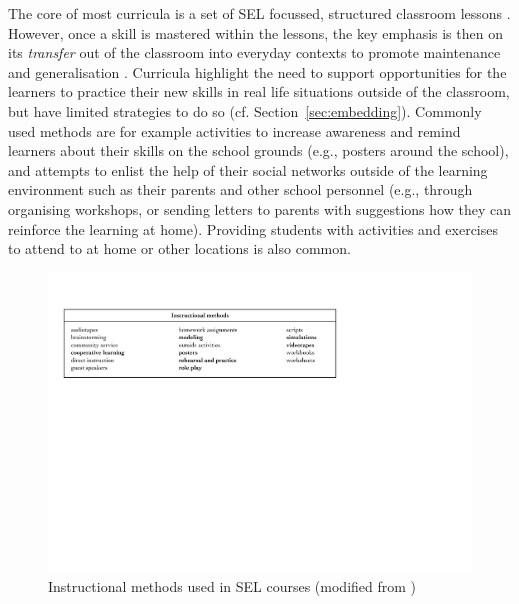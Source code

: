 \documentclass[prodmode,acmtochi]{acmsmall}
\newcommand{\todo}[1]{\textrm{\textrm{\textcolor{LightBlue}{[[#1]]}}}}
\newcommand{\todolater}[1]{}
\begin{document}
The core of most curricula is a set of SEL focussed, structured classroom lessons \cite{jones2012social}. However, once a skill is mastered within the lessons, the key emphasis is then on its \emph{transfer} out of the classroom into everyday contexts to promote maintenance and generalisation \cite{Elias1997,Maree2007,Pasi2001}. Curricula highlight the need to support opportunities for the learners to practice their new skills in real life situations outside of the classroom, but have limited strategies to do so (cf. Section~\ref{sec:embedding}). Commonly used methods are for example activities to increase awareness and remind learners about their skills on the school grounds (e.g., posters around the school), and attempts to enlist the help of their social networks outside of the learning environment such as their parents and other school personnel (e.g., through organising workshops, or sending letters to parents with suggestions how they can reinforce the learning at home). Providing students with activities and exercises to attend to at home or other locations is also common.
\todolater{Add example from SecondStep pointing to use of videorecordings and workshops for parents ==> highly useful... See \cite[p.88]{Elias1997}.}



\begin{figure}
  \centering
	\includegraphics[width=.98\textwidth]{images/Elias-MethodsList}
	\caption{Instructional methods used in SEL courses (modified from \cite[p.109]{Elias1997})}
	\label{fig:methods}
\end{figure}
\end{document}
